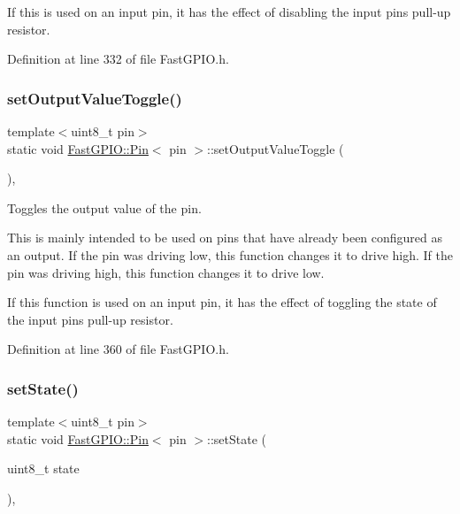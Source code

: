 If this is used on an input pin, it has the effect of disabling the input pin\textquotesingle{}s pull-\/up resistor. 

Definition at line 332 of file Fast\+G\+P\+I\+O.\+h.

\mbox{\label{class_fast_g_p_i_o_1_1_pin_a588d0cdd8971e9a6a6939704b227f299}} 
\subsubsection{\texorpdfstring{set\+Output\+Value\+Toggle()}{setOutputValueToggle()}}
{\footnotesize\ttfamily template$<$uint8\+\_\+t pin$>$ \\
static void \hyperlink{class_fast_g_p_i_o_1_1_pin}{Fast\+G\+P\+I\+O\+::\+Pin}$<$ pin $>$\+::set\+Output\+Value\+Toggle (\begin{DoxyParamCaption}{ }\end{DoxyParamCaption})\hspace{0.3cm}{\ttfamily [inline]}, {\ttfamily [static]}}



Toggles the output value of the pin. 

This is mainly intended to be used on pins that have already been configured as an output. If the pin was driving low, this function changes it to drive high. If the pin was driving high, this function changes it to drive low.

If this function is used on an input pin, it has the effect of toggling the state of the input pin\textquotesingle{}s pull-\/up resistor. 

Definition at line 360 of file Fast\+G\+P\+I\+O.\+h.

\mbox{\label{class_fast_g_p_i_o_1_1_pin_a6dae3821c6b8bcf9f3b7ac2e5114692c}} 
\subsubsection{\texorpdfstring{set\+State()}{setState()}}
{\footnotesize\ttfamily template$<$uint8\+\_\+t pin$>$ \\
static void \hyperlink{class_fast_g_p_i_o_1_1_pin}{Fast\+G\+P\+I\+O\+::\+Pin}$<$ pin $>$\+::set\+State (\begin{DoxyParamCaption}\item[{uint8\+\_\+t}]{state }\end{DoxyParamCaption})\hspace{0.3cm}{\ttfamily [inline]}, {\ttfamily [static]}}



